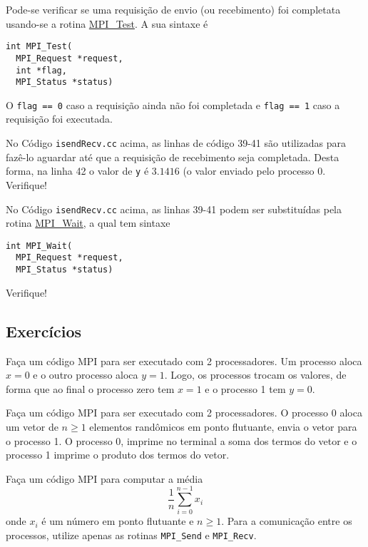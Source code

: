 Pode-se verificar se uma requisição de envio (ou recebimento) foi completata usando-se a rotina \href{https://www.open-mpi.org/doc/current/man3/MPI\_Test.3.php}{MPI\_Test}. A sua sintaxe é
\begin{verbatim}
int MPI_Test(
  MPI_Request *request, 
  int *flag, 
  MPI_Status *status)
\end{verbatim}
O \verb+flag == 0+ caso a requisição ainda não foi completada e \verb+flag == 1+ caso a requisição foi executada.

No Código \verb+isendRecv.cc+ acima, as linhas de código 39-41 são utilizadas para fazê-lo aguardar até que a requisição de recebimento seja completada. Desta forma, na linha 42 o valor de \verb+y+ é $3.1416$ (o valor enviado pelo processo 0. Verifique!

\begin{obs}
  No Código \verb+isendRecv.cc+ acima, as linhas 39-41 podem ser substituídas pela rotina \href{https://www.open-mpi.org/doc/current/man3/MPI\_Wait.3.php}{MPI\_Wait}, a qual tem sintaxe
\begin{verbatim}
int MPI_Wait(
  MPI_Request *request, 
  MPI_Status *status)
\end{verbatim}
  Verifique!
\end{obs}

\subsection* {Exercícios}

\begin{exer}
  Faça um código MPI para ser executado com 2 processadores. Um processo aloca $x = 0$ e o outro processo aloca $y=1$. Logo, os processos trocam os valores, de forma que ao final o processo zero tem $x = 1$ e o processo 1 tem $y=0$.
\end{exer}

\begin{exer}
  Faça um código MPI para ser executado com 2 processadores. O processo 0 aloca um vetor de $n\geq 1$ elementos randômicos em ponto flutuante, envia o vetor para o processo 1. O processo 0, imprime no terminal a soma dos termos do vetor e o processo 1 imprime o produto dos termos do vetor.
\end{exer}


\begin{exer}
  Faça um código MPI para computar a média
  \begin{equation}
    \frac{1}{n}\sum_{i=0}^{n-1} x_i
  \end{equation}
  onde $x_i$ é um número em ponto flutuante e $n\geq 1$. Para a comunicação entre os processos, utilize apenas as rotinas \verb+MPI_Send+ e \verb+MPI_Recv+.
\end{exer}


